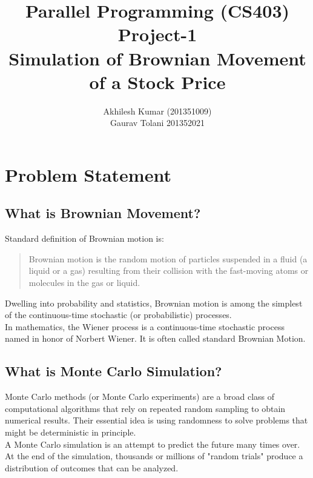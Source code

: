 \documentclass[10pt,a4paper]{article}
\author{Akhilesh Kumar (201351009) \\ Gaurav Tolani 201352021}
\title{Parallel Programming (CS403)\\ Project-1\\Simulation of Brownian Movement of a Stock Price}
\begin{document}
\maketitle
\tableofcontents
\newpage
\section{Problem Statement}
\subsection{What is Brownian Movement?}
Standard definition of Brownian motion is:
\begin{quote}
Brownian motion is the random motion of particles suspended in a fluid (a liquid or a gas) resulting from their collision with the fast-moving atoms or molecules in the gas or liquid.\end{quote}
Dwelling into probability and statistics, Brownian motion is among the simplest of the continuous-time stochastic (or probabilistic) processes.\\
In mathematics, the Wiener process is a continuous-time stochastic process named in honor of Norbert Wiener. It is often called standard Brownian Motion.
\subsection{What is Monte Carlo Simulation?}
Monte Carlo methods (or Monte Carlo experiments) are a broad class of computational algorithms that rely on repeated random sampling to obtain numerical results. Their essential idea is using randomness to solve problems that might be deterministic in principle.\\
A Monte Carlo simulation is an attempt to predict the future many times over. At the end of the simulation, thousands or millions of "random trials" produce a distribution of outcomes that can be analyzed.\\
\end{document}
